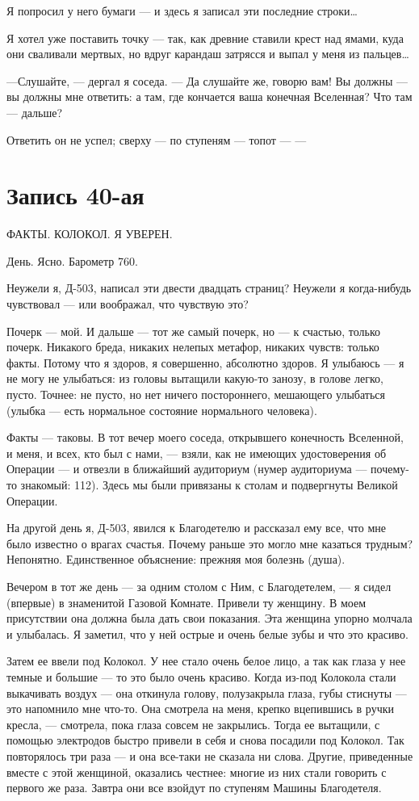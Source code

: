 \documentclass[11pt,openany]{book}
\newcommand{\bookchapterplain}[1]{%
  \clearpage\phantomsection\chapter*{#1}%
  \addcontentsline{toc}{chapter}{#1}\markboth{#1}{#1}\thispagestyle{plain}}
\begin{document}
Я попросил у него бумаги --- и здесь я записал эти последние строки\ldots{}

Я хотел уже поставить точку --- так, как древние ставили крест над ямами, куда они сваливали мертвых, но вдруг карандаш затрясся и выпал у меня из пальцев\ldots{}

---Слушайте, --- дергал я соседа. --- Да слушайте же, говорю вам! Вы должны --- вы должны мне ответить: а там, где кончается ваша конечная Вселенная? Что там --- дальше?

Ответить он не успел; сверху --- по ступеням --- топот --- ---

\bookchapterplain{Запись 40-ая}

\begin{center}\textsc{ФАКТЫ. КОЛОКОЛ. Я УВЕРЕН.}\end{center}

День. Ясно. Барометр 760.

Неужели я, Д-503, написал эти двести двадцать страниц? Неужели я когда-нибудь чувствовал --- или воображал, что чувствую это?

Почерк --- мой. И дальше --- тот же самый почерк, но --- к счастью, только почерк. Никакого бреда, никаких нелепых метафор, никаких чувств: только факты. Потому что я здоров, я совершенно, абсолютно здоров. Я улыбаюсь --- я не могу не улыбаться: из головы вытащили какую-то занозу, в голове легко, пусто. Точнее: не пусто, но нет ничего постороннего, мешающего улыбаться (улыбка --- есть нормальное состояние нормального человека).

Факты --- таковы. В тот вечер моего соседа, открывшего конечность Вселенной, и меня, и всех, кто был с нами, --- взяли, как не имеющих удостоверения об Операции --- и отвезли в ближайший аудиториум (нумер аудиториума --- почему-то знакомый: 112). Здесь мы были привязаны к столам и подвергнуты Великой Операции.

На другой день я, Д-503, явился к Благодетелю и рассказал ему все, что мне было известно о врагах счастья. Почему раньше это могло мне казаться трудным? Непонятно. Единственное объяснение: прежняя моя болезнь (душа).

Вечером в тот же день --- за одним столом с Ним, с Благодетелем, --- я сидел (впервые) в знаменитой Газовой Комнате. Привели ту женщину. В моем присутствии она должна была дать свои показания. Эта женщина упорно молчала и улыбалась. Я заметил, что у ней острые и очень белые зубы и что это красиво.

Затем ее ввели под Колокол. У нее стало очень белое лицо, а так как глаза у нее темные и большие --- то это было очень красиво. Когда из-под Колокола стали выкачивать воздух --- она откинула голову, полузакрыла глаза, губы стиснуты --- это напомнило мне что-то. Она смотрела на меня, крепко вцепившись в ручки кресла, --- смотрела, пока глаза совсем не закрылись. Тогда ее вытащили, с помощью электродов быстро привели в себя и снова посадили под Колокол. Так повторялось три раза --- и она все-таки не сказала ни слова. Другие, приведенные вместе с этой женщиной, оказались честнее: многие из них стали говорить с первого же раза. Завтра они все взойдут по ступеням Машины Благодетеля.
\end{document}
